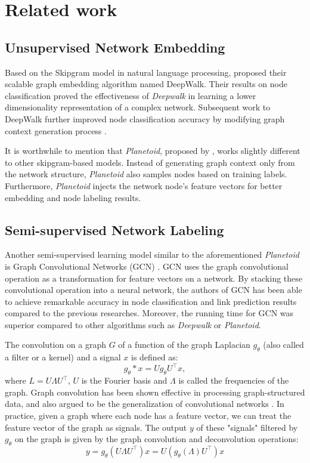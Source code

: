 \documentclass{article}
\theoremstyle{definition}
\begin{document}
\section{Related work}

\subsection{Unsupervised Network Embedding}

Based on the Skipgram model \cite{skipgram} in natural language 
processing, \citeauthor{deepwalk} proposed their scalable graph embedding 
algorithm named DeepWalk. Their results on node classification proved the 
effectiveness of \emph{Deepwalk} in learning a lower dimensionality 
representation of a complex network. Subsequent  work to DeepWalk further 
improved node classification accuracy by modifying graph context 
generation process \cite{line,grarep,planetoid,node2vec}. 

It is worthwhile to mention that \emph{Planetoid}, proposed by 
\citeauthor{planetoid}, works slightly different to other skipgram-based 
models. Instead of generating graph context only from the network 
structure, \emph{Planetoid} also samples nodes based on training labels. 
Furthermore, \emph{Planetoid} injects the network
node's feature vectors for better embedding and node labeling results.

\subsection{Semi-supervised Network Labeling}

Another semi-supervised learning model similar to the aforementioned
\emph{Planetoid} is Graph Convolutional Networks (GCN) \cite{gcn}. 
GCN uses the graph convolutional operation as a transformation for 
feature vectors on a network. By stacking these convolutional operation 
into a neural network, the authors of GCN has been able to achieve 
remarkable accuracy in node classification and link prediction results 
compared to the previous researches. Moreover, the running time for GCN 
was superior compared to other algorithms such as \emph{Deepwalk} or 
\emph{Planetoid}.

The convolution on a graph $G$ of a function of the graph 
Laplacian $g_{\theta}$ (also called a filter or a kernel) 
and a signal $x$ is defined as:
$$g_{\theta} \ast x = U g_{\theta} U^{\top} x,$$
where $L = U \Lambda U^\top$, $U$ is the Fourier basis
and $\Lambda$ is called the frequencies of the graph. 
Graph convolution has been shown effective in processing
graph-structured data, and also argued to be the generalization
of convolutional networks
\cite{shuman2013emerging,defferrard2016convolutional,gcn}.
In practice, given a graph where each node has a feature vector,
we can treat the feature vector of the graph as signals. The output $y$
of these "signals" filtered by $g_\theta$ on the graph is given by
the graph convolution and deconvolution operations: 
\begin{equation}
\label{eq:1}
y = g_\theta (U \Lambda U^\top) x = U (g_\theta(\Lambda) U^\top)x
\end{equation}
\end{document}
